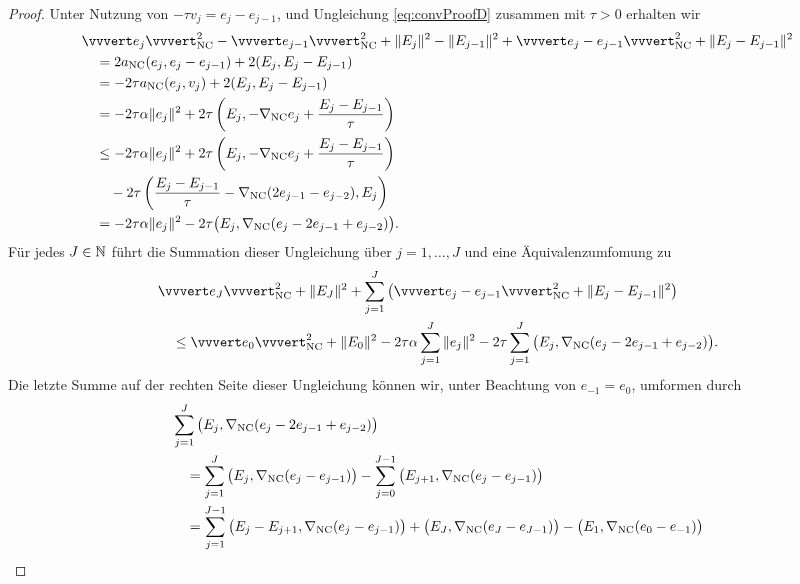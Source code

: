 \begin{proof}
  Unter Nutzung von $-\tau v_j=e_j-e_{j-1}$,  und
  Ungleichung \eqref{eq:convProofD} zusammen mit $\tau>0$ erhalten wir 
  \begin{align*}
    &\vvvert e_j \vvvert^2_\nc   -
    \vvvert e_{j-1}\vvvert_\nc^2 +
    \Vert E_j \Vert^2 - \Vert E_{j-1}\Vert^2 +
    \vvvert e_j-e_{j-1}\vvvert_\nc^2 +
    \Vert E_j - E_{j-1} \Vert^2\\
    &\quad =
    2a_\nc(e_j,e_j-e_{j-1}) + 2(E_j,E_j-E_{j-1})\\
    &\quad =
    -2\tau a_\nc(e_j,v_j) + 2(E_j,E_j-E_{j-1})\\
    &\quad =
    -2\tau\alpha\Vert e_j\Vert^2 + 2\tau\left(E_j,
    -\nabla_\nc e_j+\frac{E_j-E_{j-1}}{\tau}\right) \\
    &\quad \leq
    -2\tau\alpha\Vert e_j\Vert^2 + 2\tau\left(E_j,
    -\nabla_\nc e_j+\frac{E_j-E_{j-1}}{\tau}\right)\\ 
    &\quad\quad -2\tau\left( \frac{E_j-E_{j-1}}{\tau}
    -\gradnc(2e_{j-1}-e_{j-2}),E_j\right)\\
    &\quad =
    -2\tau\alpha\Vert e_j\Vert^2 - 
    2\tau\big(E_j,\gradnc(e_j-2e_{j-1}+e_{j-2})\big).
  \end{align*}
  Für jedes $J\in\mathbb{N}$ führt die Summation dieser Ungleichung über
  $j=1,\ldots,J$ und eine Äquivalenzumfomung zu
  \begin{equation}
    \label{eq:convProofF}
    \begin{aligned}
      &\vvvert e_J \vvvert^2_\nc +\Vert E_J \Vert^2 
      +\sum_{j=1}^J\left(\vvvert e_j-e_{j-1} \vvvert_\nc^2 + 
      \Vert E_j-E_{j-1}\Vert^2\right)\\
      &\quad \leq 
      \vvvert e_0 \vvvert_\nc^2 + \Vert E_0 \Vert^2 
      -2\tau\alpha\sum_{j=1}^J \Vert e_j\Vert^2 
      -2\tau \sum_{j=1}^J\big(E_j,\gradnc
      (e_j-2e_{j-1}+e_{j-2})\big).
    \end{aligned}
  \end{equation}
  Die letzte Summe auf der rechten Seite dieser Ungleichung können wir, unter
  Beachtung von $e_{-1}=e_0$, umformen durch
  \begin{align*}
    &\sum_{j=1}^J\big(E_j,\gradnc
    (e_j-2e_{j-1}+e_{j-2})\big)\\
    &\quad=\sum_{j=1}^J\big(E_j,\gradnc(e_j-e_{j-1})\big)
    -
    \sum_{j=0}^{J-1}\big(E_{j+1},\gradnc(e_j-e_{j-1})\big) \\
    &\quad = 
    \sum_{j=1}^{J-1} 
    \big(E_j-E_{j+1},\gradnc(e_j-e_{j-1})\big)
    +\big(E_J,\gradnc(e_J-e_{J-1})\big)
    - \big(E_1, \gradnc(e_0-e_{-1})\big) \\

\end{align*}
\end{proof}
